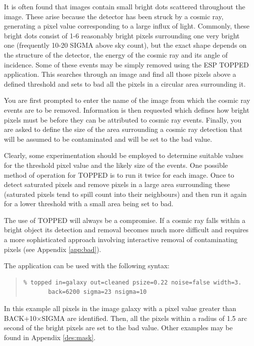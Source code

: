 \documentclass[twoside,11pt]{article}
\newenvironment{myquote}{\begin{quote}\begin{small}}{\end{small}\end{quote}}
\begin{document}
It is often found that images contain small bright dots scattered throughout 
the image. These arise because the detector has been struck by a cosmic ray, 
generating a pixel value corresponding to a large influx of light. Commonly, 
these bright dots consist of 1-6 reasonably bright pixels surrounding one 
very bright one (frequently 10-20 SIGMA above sky count), but 
the exact shape depends on the structure of the detector, the energy of 
the cosmic ray and its angle of incidence. Some of these events may be 
simply removed using the ESP TOPPED application. This searches 
through an image and find all those pixels above a defined threshold and 
sets to bad all the pixels in a circular area surrounding it. 

You are first
prompted to enter the name of the image from which the cosmic ray events are 
to be removed. Information is then requested which defines how bright pixels 
must be before they can be attributed to cosmic ray events. Finally, you are
asked to define 
the size of the area surrounding a cosmic ray detection that will be 
assumed to be contaminated and will be set to the bad value. 

Clearly, some experimentation should be employed to determine 
suitable values for the threshold pixel value and the likely size of the 
events. One possible method of operation for TOPPED is to run it twice for 
each image. Once to detect saturated pixels and remove pixels in a 
large area surrounding these (saturated pixels tend to spill count into 
their neighbours) and then run it again for a lower threshold with a small area
being set to bad. 

The use of TOPPED will always be a compromise. If a cosmic ray falls 
within a bright object its detection and removal becomes much more 
difficult and requires a more sophisticated approach involving 
interactive removal of contaminating pixels (see Appendix \ref{app:bad}). 

The application can be used with the following syntax:

\begin{myquote}
\begin{verbatim}
% topped in=galaxy out=cleaned psize=0.22 noise=false width=3.
       back=6200 sigma=23 nsigma=10
\end{verbatim}
\end{myquote}

In this example all pixels in the image galaxy with a pixel value 
greater than BACK$+$10$\times$SIGMA are identified. Then, all the pixels 
within a radius of 1.5 arc second of the bright pixels are set to the 
bad value. Other examples may be found in Appendix \ref{des:mask}.
\end{document}
